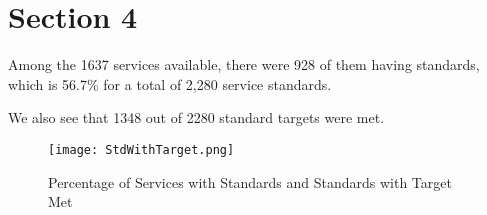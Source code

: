 \section{Section 4}

Among the 1637 services available, there were 928 of them having standards, which is 56.7\% for a total of 2,280 service standards.

We also see that 1348 out of 2280 standard targets were met.


\begin{figure}
    \centering
    \texttt{[image: StdWithTarget.png]}
    \caption{\label{fig:Std}Percentage of Services with Standards and Standards with Target Met}
    \end{figure}
